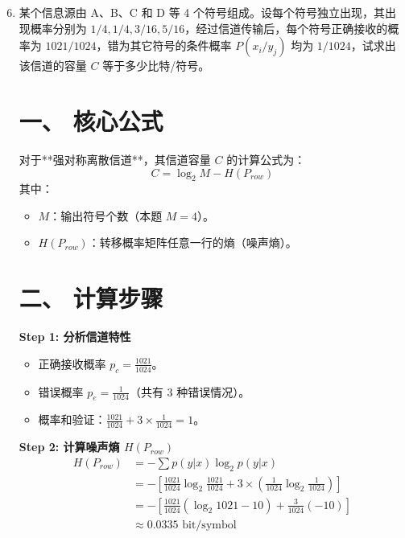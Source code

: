 \documentclass[a4paper,11pt]{ctexart}
\begin{document}
\begin{enumerate}[label=\textbf{4-\arabic*}]
    \setcounter{enumi}{5} %
    \item 某个信息源由 A、B、C 和 D 等 4 个符号组成。设每个符号独立出现，其出现概率分别为 $1/4, 1/4, 3/16, 5/16$，经过信道传输后，每个符号正确接收的概率为 $1021/1024$，错为其它符号的条件概率 $P(x_i/y_j)$ 均为 $1/1024$，试求出该信道的容量 $C$ 等于多少比特/符号。
    \begin{tcolorbox}[colback=white, colframe=blue!50!black, title=\textbf{题目解答：4-7 离散对称信道容量计算}]

        \section*{一、 核心公式}
        
        对于**强对称离散信道**，其信道容量 $C$ 的计算公式为：
        \begin{equation}
            C = \log_2 M - H(P_{row})
        \end{equation}
        其中：
        \begin{itemize}
            \item $M$：输出符号个数（本题 $M=4$）。
            \item $H(P_{row})$：转移概率矩阵任意一行的熵（噪声熵）。
        \end{itemize}

        \end{tcolorbox}

        \section*{二、 计算步骤}
        
        \textbf{Step 1: 分析信道特性}
        \begin{itemize}
            \item 正确接收概率 $p_c = \frac{1021}{1024}$。
            \item 错误概率 $p_e = \frac{1}{1024}$（共有 3 种错误情况）。
            \item 概率和验证：$\frac{1021}{1024} + 3 \times \frac{1}{1024} = 1$。
        \end{itemize}

        \textbf{Step 2: 计算噪声熵 $H(P_{row})$}
        \begin{align*}
            H(P_{row}) &= - \sum p(y|x) \log_2 p(y|x) \\
                    &= - \left[ \frac{1021}{1024} \log_2 \frac{1021}{1024} + 3 \times \left( \frac{1}{1024} \log_2 \frac{1}{1024} \right) \right] \\
                    &= - \left[ \frac{1021}{1024}(\log_2 1021 - 10) + \frac{3}{1024}(-10) \right] \\
                    &\approx 0.0335 \text{ bit/symbol}
        \end{align*}


\end{enumerate}
\end{document}
